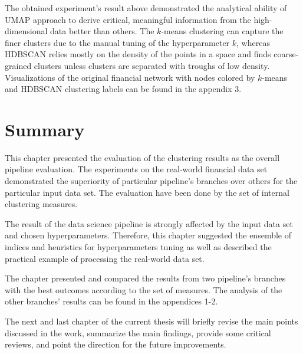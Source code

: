 The obtained experiment's result above demonstrated the analytical ability of UMAP approach to derive critical, meaningful information from the high-dimensional data better than others. The $k$-means clustering can capture the finer clusters due to the manual tuning of the hyperparameter $k$, whereas HDBSCAN relies mostly on the density of the points in a space and finds coarse-grained clusters unless clusters are separated with troughs of low density. Visualizations of the original financial network with nodes colored by $k$-means and HDBSCAN clustering labels can be found in the appendix 3.

\section{Summary}
This chapter presented the evaluation of the clustering results as the overall pipeline evaluation. The experiments on the real-world financial data set demonstrated the superiority of particular pipeline's branches over others for the particular input data set. The evaluation have been done by the set of internal clustering measures.

The result of the data science pipeline is strongly affected by the input data set and chosen hyperparameters. Therefore, this chapter suggested the ensemble of indices and heuristics for hyperparameters tuning as well as described the practical example of processing the real-world data set.

The chapter presented and compared the results from two pipeline's branches with the best outcomes according to the set of measures. The analysis of the other branches' results can be found in the appendices 1-2.

The next and last chapter of the current thesis will briefly revise the main points discussed in the work, summarize the main findings, provide some critical reviews, and point the direction for the future improvements.
